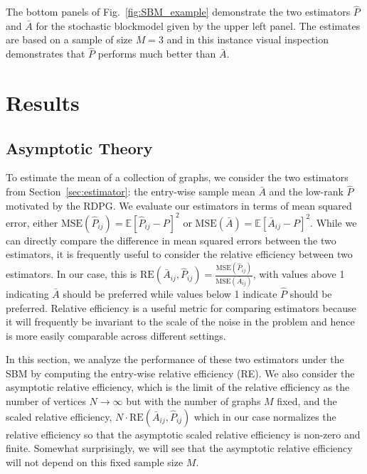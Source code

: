 \documentclass[10pt,letterpaper]{article}
\newcommand{\Ex}{\mathbb{E}}
\renewcommand{\hat}{\widehat}
\begin{document}
The bottom panels of Fig.~\ref{fig:SBM_example} demonstrate the two estimators $\hat{P}$ and $\bar{A}$ for the stochastic blockmodel given by the upper left panel. 
The estimates are based on a sample of size $M=3$ and in this instance visual inspection demonstrates that $\hat{P}$ performs much better than $\bar{A}$.



\section{Results}
\label{sec:result}

\subsection{Asymptotic Theory}
\label{section:theoretical_result}
To estimate the mean of a collection of graphs, we consider the two estimators from Section~\ref{sec:estimator}: the entry-wise sample mean $\bar{A}$ and the low-rank $\hat{P}$ motivated by the RDPG.
We evaluate our estimators in terms of mean squared error, either $\mathrm{MSE}(\hat{P}_{ij})=\Ex[\hat{P}_{ij}-P]^2$ or $\mathrm{MSE}(\bar{A})=\Ex[\bar{A}_{ij}-P]^2$.
While we can directly compare the difference in mean squared errors between the two estimators, it is frequently useful to consider the relative efficiency between two estimators.
In our case, this is $\mathrm{RE}(\bar{A}_{ij},\hat{P}_{ij}) = \frac{\mathrm{MSE}(\hat{P}_{ij})}{\mathrm{MSE}(\bar{A}_{ij})}$, with values above 1 indicating $\bar{A}$ should be preferred while values below 1 indicate $\hat{P}$ should be preferred.
Relative efficiency is a useful metric for comparing estimators because it will frequently be invariant to the scale of the noise in the problem and hence is more easily comparable across different settings.

In this section, we analyze the performance of these two estimators under the SBM by computing the entry-wise relative efficiency (RE).
We also consider the asymptotic relative efficiency, which is the limit of the relative efficiency as the number of vertices $N\to\infty$ but with the number of graphs $M$ fixed, and the scaled relative efficiency, $N\cdot \mathrm{RE}(\bar{A}_{ij},\hat{P}_{ij}) $ which in our case normalizes the relative efficiency so that the asymptotic scaled relative efficiency is non-zero and finite. Somewhat surprisingly, we will see that the asymptotic relative efficiency will not depend on this fixed sample size $M$.
\end{document}
